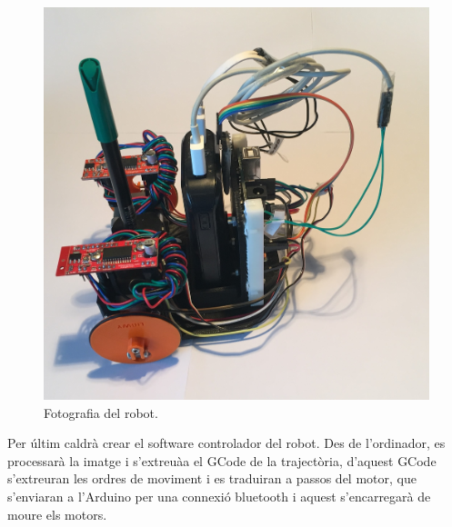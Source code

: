 \begin{figure}[H]
	\centering
	\includegraphics[scale=0.1]{RobotFoto}
	\caption{Fotografia del robot.}
	\label{fig:foto}
\end{figure}

Per últim caldrà crear el software controlador del robot. Des de l'ordinador, es processarà la imatge i s'extreuàa el GCode de la trajectòria, d'aquest GCode s'extreuran les ordres de moviment i es traduiran a passos del motor, que s'enviaran a l'Arduino per una connexió bluetooth i aquest s'encarregarà de moure els motors. 

